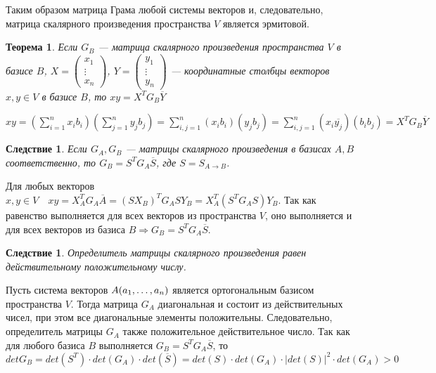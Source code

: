 Таким образом матрица Грама любой системы векторов и, следовательно, матрица скалярного произведения пространства $V$ является эрмитовой.
\newtheorem*{th14_9_1}{Теорема}\begin{th14_9_1}Если $G_B$ --- матрица скалярного произведения пространства $V$ в базисе $B$, $ X=\begin{pmatrix}
		x_1\\
		\vdots\\
		x_n
	\end{pmatrix}$, 
	$ Y=\begin{pmatrix}
		y_1\\
		\vdots\\
		y_n
	\end{pmatrix}$ --- координатные столбцы векторов $x, y\in V$ в базисе $B$, то $xy=X^T G_B \overline{Y} $
\end{th14_9_1}\begin{Proof}
	$xy=(\sum\limits_{i=1}^{n}{x_ib_i})(\sum\limits_{j=1}^{n}{y_jb_j})=\sum\limits_{i,j=1}^{n}{(x_ib_i)(y_jb_j)}=\sum\limits_{i,j=1}^{n}{(x_i\overline{y_j})(b_ib_j)}=X^TG_B\overline{Y}$
\end{Proof}
\newtheorem*{cor14_9_1}{Следствие}\begin{cor14_9_1}Если $G_A, G_B$ --- матрицы скалярного произведения в базисах $A, B$ соответственно, то $G_B = S^TG_A\overline{S}$, где $S = S_{A\rightarrow B}$.
\end{cor14_9_1}\begin{Proof}
	Для любых векторов $x,y\in V\quad xy = X_A^TG_A\overline{A} = (SX_B)^TG_ASY_B=X_A^T(S^TG_AS)Y_B$. Так как равенство выполняется для всех векторов из пространства $V$, оно выполняется и для всех векторов из базиса $B\Rightarrow G_B = S^TG_A\overline{S}$.
\end{Proof}
\newtheorem*{cor14_9_2}{Следствие}\begin{cor14_9_2}
	Определитель матрицы скалярного произведения равен действительному положительному числу.
\end{cor14_9_2}\begin{Proof}
	Пусть система векторов $A(a_1,\dots,a_n)$ является ортогональным базисом пространства $V$. 
	Тогда матрица
	$G_A$ диагональная и состоит из действительных чисел, при этом все диагональные элементы положительны. Следовательно, определитель матрицы $G_A$ также положительное действительное число. Так как для любого базиса $B$ выполняется $G_B = S^T G_A \overline{S}$, то
	$det G_B = det(S^T)\cdot det(G_A)\cdot det(\overline{S})= det(S)\cdot det(G_A) \cdot|det(S)|^2\cdot det(G_A) > 0$ 
\end{Proof}\\\\
